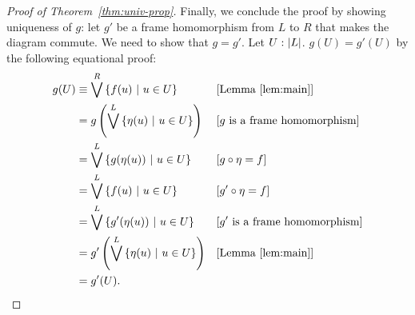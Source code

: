 \begin{proof}[Proof of Theorem~\ref{thm:univ-prop}]
  Finally, we conclude the proof by showing uniqueness of $g$: let $g'$ be a frame
  homomorphism from $L$ to $R$ that makes the diagram commute. We need to show that
  $g = g'$. Let $U\hspace{0.1mm}:\hspace{0.1mm}\left| L \right|$. $g(U) = g'(U)$ by the following equational proof:
  \begin{align*}
    g(U) &\equiv \bigvee^R \left\{  f(u) ~|~ u \in U  \right\}
            &&\text{[Lemma~\ref{lem:main}]} \\
         &= g \left( \bigvee^L \left\{  \eta(u) ~|~ u \in U  \right\} \right) 
            &&\text{[$g$ is a frame homomorphism]} \\
         &= \bigvee^L \left\{  g(\eta(u)) ~|~ u \in U  \right\}
            &&\text{[$g \circ \eta = f$]} \\
         &= \bigvee^L \left\{  f(u) ~|~ u \in U  \right\}
            &&\text{[$g' \circ \eta = f$]} \\
         &= \bigvee^L \left\{  g'(\eta(u)) ~|~ u \in U  \right\}
            &&\text{[$g'$ is a frame homomorphism]} \\
         &= g'\left( \bigvee^L \left\{  \eta(u) ~|~ u \in U  \right\} \right)
            &&\text{[Lemma~\ref{lem:main}]} \\
         &= g'(U).
  \end{align*}
\end{proof}
